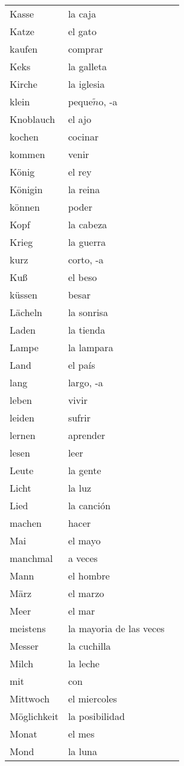 \documentclass[10pt,spanish]{article}
\begin{document}
\begin{longtable}{p{} p{} | p{}}
Kasse & la caja  \\
Katze & el gato  \\
kaufen & comprar  \\
Keks & la galleta  \\
Kirche & la iglesia  \\
klein & peque$\tilde{n}$o, -a  \\
Knoblauch & el ajo  \\
kochen & cocinar  \\
kommen & venir  \\
König & el rey  \\
Königin & la reina  \\
können & poder  \\
Kopf & la cabeza \\
Krieg & la guerra  \\
kurz & corto, -a  \\
Kuß & el beso  \\
küssen & besar  \\
Lächeln & la sonrisa  \\
Laden & la tienda  \\
Lampe & la lampara  \\
Land & el país  \\
lang & largo, -a  \\
leben & vivir  \\
leiden & sufrir  \\
lernen & aprender  \\
lesen & leer  \\
Leute & la gente \\
Licht & la luz \\
Lied & la canción \\
machen & hacer  \\
Mai & el mayo  \\
manchmal & a veces  \\
Mann & el hombre  \\
März & el marzo  \\
Meer & el mar  \\
meistens & la mayoria de las veces  \\
Messer & la cuchilla  \\
Milch & la leche  \\
mit & con  \\
Mittwoch & el miercoles  \\
Möglichkeit & la posibilidad  \\
Monat & el mes  \\
Mond & la luna  \\

\end{longtable}
\end{document}

